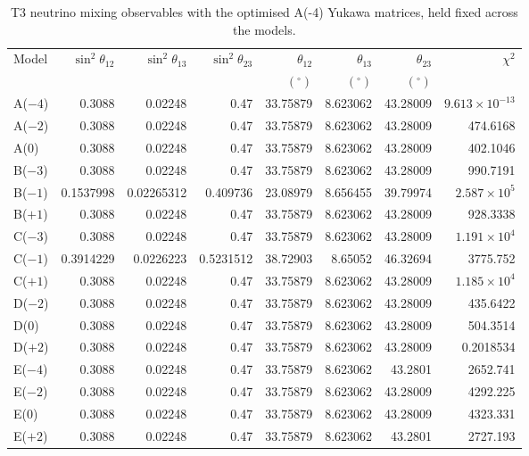 \begin{table}[p]
\centering
\caption{T3 neutrino mixing observables with the optimised A(-4) Yukawa matrices, held fixed across the models.}
\label{tab:appC_Am4_mixing}
\begingroup
\footnotesize
\setlength{\tabcolsep}{3.2pt}
\begin{tabular}{lrrrrrrr}
\hline
Model & $\sin^2\theta_{12}$ & $\sin^2\theta_{13}$ & $\sin^2\theta_{23}$ & $\theta_{12}$ & $\theta_{13}$ & $\theta_{23}$ & $\chi^2$ \\
 &  &  &  & $(^\circ)$ & $(^\circ)$ & $(^\circ)$ &  \\
\hline
A($-4$) & 0.3088 & 0.02248 & 0.47 & 33.75879 & 8.623062 & 43.28009 & $9.613\times10^{-13}$ \\
A($-2$) & 0.3088 & 0.02248 & 0.47 & 33.75879 & 8.623062 & 43.28009 & 474.6168 \\
A($0$) & 0.3088 & 0.02248 & 0.47 & 33.75879 & 8.623062 & 43.28009 & 402.1046 \\
B($-3$) & 0.3088 & 0.02248 & 0.47 & 33.75879 & 8.623062 & 43.28009 & 990.7191 \\
B($-1$) & 0.1537998 & 0.02265312 & 0.409736 & 23.08979 & 8.656455 & 39.79974 & $2.587\times10^{5}$ \\
B($+1$) & 0.3088 & 0.02248 & 0.47 & 33.75879 & 8.623062 & 43.28009 & 928.3338 \\
C($-3$) & 0.3088 & 0.02248 & 0.47 & 33.75879 & 8.623062 & 43.28009 & $1.191\times10^{4}$ \\
C($-1$) & 0.3914229 & 0.0226223 & 0.5231512 & 38.72903 & 8.65052 & 46.32694 & 3775.752 \\
C($+1$) & 0.3088 & 0.02248 & 0.47 & 33.75879 & 8.623062 & 43.28009 & $1.185\times10^{4}$ \\
D($-2$) & 0.3088 & 0.02248 & 0.47 & 33.75879 & 8.623062 & 43.28009 & 435.6422 \\
D($0$) & 0.3088 & 0.02248 & 0.47 & 33.75879 & 8.623062 & 43.28009 & 504.3514 \\
D($+2$) & 0.3088 & 0.02248 & 0.47 & 33.75879 & 8.623062 & 43.28009 & 0.2018534 \\
E($-4$) & 0.3088 & 0.02248 & 0.47 & 33.75879 & 8.623062 & 43.2801 & 2652.741 \\
E($-2$) & 0.3088 & 0.02248 & 0.47 & 33.75879 & 8.623062 & 43.28009 & 4292.225 \\
E($0$) & 0.3088 & 0.02248 & 0.47 & 33.75879 & 8.623062 & 43.28009 & 4323.331 \\
E($+2$) & 0.3088 & 0.02248 & 0.47 & 33.75879 & 8.623062 & 43.2801 & 2727.193 \\
\hline
\end{tabular}
\endgroup
\end{table}
